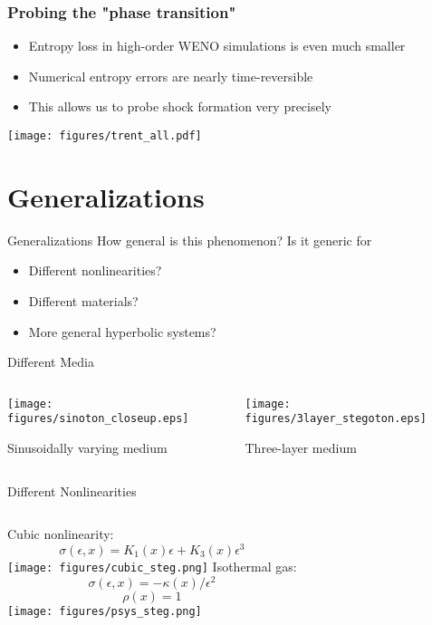 \documentclass[xcolor=pst,dvipsnames]{beamer}
\begin{document}
\begin{frame} \frametitle{Probing the "phase transition"}
  \begin{itemize}
    \item Entropy loss in high-order WENO simulations is even much smaller
    \item Numerical entropy errors are nearly time-reversible
    \item This allows us to probe shock formation very precisely
  \end{itemize}
  \begin{center} \texttt{[image: figures/trent\_all.pdf]} \end{center}
\end{frame}

\section{Generalizations}
\begin{frame}{Generalizations}
How general is this phenomenon?  Is it generic for
\begin{itemize}
  \item Different nonlinearities?
  \item Different materials?
  \item More general hyperbolic systems?
\end{itemize}
\end{frame}


\begin{frame}{Different Media}
\begin{columns}
  \column{5cm}
\begin{center} \texttt{[image: figures/sinoton\_closeup.eps]}

Sinusoidally varying medium \end{center}
  \column{5cm}
\begin{center} \texttt{[image: figures/3layer\_stegoton.eps]}

Three-layer medium \end{center}
\end{columns}
\end{frame}

\begin{frame}{Different Nonlinearities}
\begin{columns}
  \column{5cm}
  Cubic nonlinearity:
  $$\sigma(\epsilon,x) = K_1(x)\epsilon + K_3(x)\epsilon^3$$
  \texttt{[image: figures/cubic\_steg.png]}
  \column{5cm}
  Isothermal gas:
  $$\sigma(\epsilon,x) = -\kappa(x)/\epsilon^2$$
  $$\rho(x)=1$$
  \texttt{[image: figures/psys\_steg.png]}
\end{columns}
\end{frame}
\end{document}
